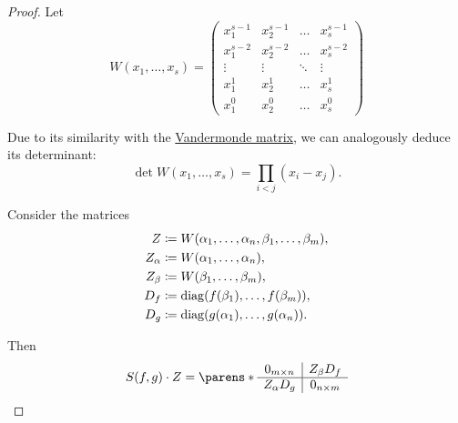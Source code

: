 \begin{proof}
  Let
  \begin{equation*}
    W(x_1, \ldots, x_s) =
    \begin{pmatrix}
      x_1^{s-1} & x_2^{s-1} & \ldots & x_s^{s-1} \\
      x_1^{s-2} & x_2^{s-2} & \ldots & x_s^{s-2} \\
      \vdots    & \vdots    & \ddots & \vdots    \\
      x_1^1     & x_2^1     & \ldots & x_s^1     \\
      x_1^0     & x_2^0     & \ldots & x_s^0
    \end{pmatrix}
  \end{equation*}

  Due to its similarity with the \hyperref[ex:vandermonde_matrix]{Vandermonde matrix}, we can analogously deduce its determinant:
  \begin{equation}\label{eq:thm:resultant_as_product/proof/w_determinant}
    \det W(x_1, \ldots, x_s) = \prod_{i < j} (x_i - x_j).
  \end{equation}

  Consider the matrices
  \begin{align*}
    Z        &\coloneqq W(\alpha_1, \ldots, \alpha_n, \beta_1, \ldots, \beta_m), \\
    Z_\alpha &\coloneqq W(\alpha_1, \ldots, \alpha_n), \\
    Z_\beta  &\coloneqq W(\beta_1, \ldots, \beta_m), \\
    D_f      &\coloneqq \op{diag}(f(\beta_1), \ldots, f(\beta_m)), \\
    D_g      &\coloneqq \op{diag}(g(\alpha_1), \ldots, g(\alpha_n)).
  \end{align*}

  Then
  \begin{equation}\label{eq:thm:resultant_as_product/proof/matrix_product}
    S(f, g) \cdot Z =
    \parens*
      {
        \begin{array}{c | c}
          0_{m \times n} & Z_\beta D_f   \\
          \hline
          Z_\alpha D_g   & 0_{n \times m}
        \end{array}
      }
  \end{equation}


\end{proof}
